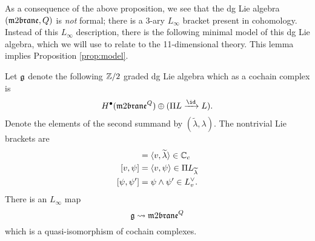 \parsec[]

As a consequence of the above proposition, we see that the dg Lie algebra $(\m2,Q)$ is {\em not} formal; there is a 3-ary $L_\infty$ bracket present in cohomology. 
Instead of this $L_\infty$ description, there is the following minimal model of this dg Lie algebra, which we will use to relate to the 11-dimensional theory. 
This lemma implies Proposition \ref{prop:model}.

\begin{lem}
\label{lem:gmodel}
Let $\mathfrak g$ denote the following $\mathbb Z/2$ graded dg Lie algebra which as a cochain complex is
\[
H^\bu(\m2^Q) \oplus (\Pi L \xto{\id} L)  .
\]
Denote the elements of the second summand by $(\tilde{\lambda}, \lambda)$. 
The nontrivial Lie brackets are
\begin{align*}
[v,\lambda] & = \<v, \til\lambda\> \in \CC_c \\ 
[v,\psi] & = \<v, \psi\> \in \Pi L_{\Tilde{\lambda}} \\
[\psi, \psi'] & = \psi \wedge \psi' \in L^\vee_v  .
\end{align*}
There is an $L_\infty$ map 
\[
\fg \rightsquigarrow \m2^Q
\] 
which is a quasi-isomorphism of cochain complexes.  
\end{lem}
